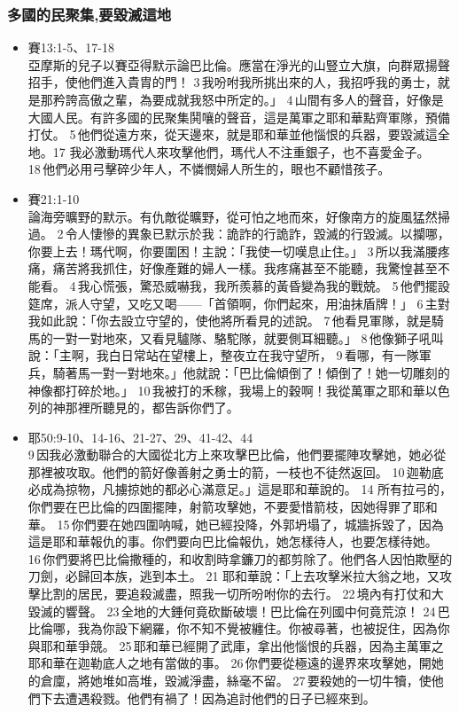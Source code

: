 \subsubsection{多國的民聚集,要毀滅這地}
\begin{itemize}
\item 賽13:1-5、17-18\\
亞摩斯的兒子以賽亞得默示論巴比倫。應當在淨光的山豎立大旗，向群眾揚聲招手，使他們進入貴胄的門！ 3 我吩咐我所挑出來的人，我招呼我的勇士，就是那矜誇高傲之輩，為要成就我怒中所定的。」 4 山間有多人的聲音，好像是大國人民。有許多國的民聚集鬨嚷的聲音，這是萬軍之耶和華點齊軍隊，預備打仗。 5 他們從遠方來，從天邊來，就是耶和華並他惱恨的兵器，要毀滅這全地。17 我必激動瑪代人來攻擊他們，瑪代人不注重銀子，也不喜愛金子。 18 他們必用弓擊碎少年人，不憐憫婦人所生的，眼也不顧惜孩子。
\item 賽21:1-10\\
論海旁曠野的默示。有仇敵從曠野，從可怕之地而來，好像南方的旋風猛然掃過。 2 令人悽慘的異象已默示於我：詭詐的行詭詐，毀滅的行毀滅。以攔哪，你要上去！瑪代啊，你要圍困！主說：「我使一切嘆息止住。」 3 所以我滿腰疼痛，痛苦將我抓住，好像產難的婦人一樣。我疼痛甚至不能聽，我驚惶甚至不能看。 4 我心慌張，驚恐威嚇我，我所羨慕的黃昏變為我的戰兢。 5 他們擺設筵席，派人守望，又吃又喝——「首領啊，你們起來，用油抹盾牌！」 6 主對我如此說：「你去設立守望的，使他將所看見的述說。 7 他看見軍隊，就是騎馬的一對一對地來，又看見驢隊、駱駝隊，就要側耳細聽。」 8 他像獅子吼叫說：「主啊，我白日常站在望樓上，整夜立在我守望所， 9 看哪，有一隊軍兵，騎著馬一對一對地來。」他就說：「巴比倫傾倒了！傾倒了！她一切雕刻的神像都打碎於地。」
10 我被打的禾稼，我場上的穀啊！我從萬軍之耶和華以色列的神那裡所聽見的，都告訴你們了。
\item 耶50:9-10、14-16、21-27、29、41-42、44\\
9 因我必激動聯合的大國從北方上來攻擊巴比倫，他們要擺陣攻擊她，她必從那裡被攻取。他們的箭好像善射之勇士的箭，一枝也不徒然返回。 10 迦勒底必成為掠物，凡擄掠她的都必心滿意足。」這是耶和華說的。
14 所有拉弓的，你們要在巴比倫的四圍擺陣，射箭攻擊她，不要愛惜箭枝，因她得罪了耶和華。 15 你們要在她四圍呐喊，她已經投降，外郭坍塌了，城牆拆毀了，因為這是耶和華報仇的事。你們要向巴比倫報仇，她怎樣待人，也要怎樣待她。 16 你們要將巴比倫撒種的，和收割時拿鐮刀的都剪除了。他們各人因怕欺壓的刀劍，必歸回本族，逃到本土。
21 耶和華說：「上去攻擊米拉大翁之地，又攻擊比割的居民，要追殺滅盡，照我一切所吩咐你的去行。 22 境內有打仗和大毀滅的響聲。 23 全地的大錘何竟砍斷破壞！巴比倫在列國中何竟荒涼！ 24 巴比倫哪，我為你設下網羅，你不知不覺被纏住。你被尋著，也被捉住，因為你與耶和華爭競。 25 耶和華已經開了武庫，拿出他惱恨的兵器，因為主萬軍之耶和華在迦勒底人之地有當做的事。 26 你們要從極遠的邊界來攻擊她，開她的倉廩，將她堆如高堆，毀滅淨盡，絲毫不留。 27 要殺她的一切牛犢，使他們下去遭遇殺戮。他們有禍了！因為追討他們的日子已經來到。 

\end{itemize}
